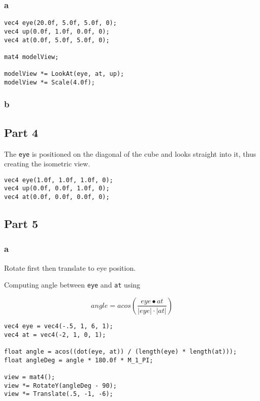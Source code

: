 \subsubsection{a}
\begin{lstlisting}
vec4 eye(20.0f, 5.0f, 5.0f, 0);
vec4 up(0.0f, 1.0f, 0.0f, 0);
vec4 at(0.0f, 5.0f, 5.0f, 0);

mat4 modelView;

modelView *= LookAt(eye, at, up);
modelView *= Scale(4.0f);
\end{lstlisting}

\subsubsection{b}


\subsection{Part 4}

The \texttt{eye} is positioned on the diagonal of the cube and looks straight into it, thus creating the isometric view.

\begin{lstlisting}
vec4 eye(1.0f, 1.0f, 1.0f, 0);
vec4 up(0.0f, 0.0f, 1.0f, 0);
vec4 at(0.0f, 0.0f, 0.0f, 0);
\end{lstlisting}

\subsection{Part 5}

\subsubsection{a}
Rotate first then translate to eye position.

Computing angle between \texttt{eye} and \texttt{at} using

\[
angle = acos\left( \frac{eye \bullet at}{\lvert eye \rvert \cdot \lvert at \rvert}  \right)
\]


\begin{lstlisting}
vec4 eye = vec4(-.5, 1, 6, 1);
vec4 at = vec4(-2, 1, 0, 1);

float angle = acos((dot(eye, at)) / (length(eye) * length(at)));
float angleDeg = angle * 180.0f * M_1_PI;

view = mat4();
view *= RotateY(angleDeg - 90);
view *= Translate(.5, -1, -6);
\end{lstlisting}

